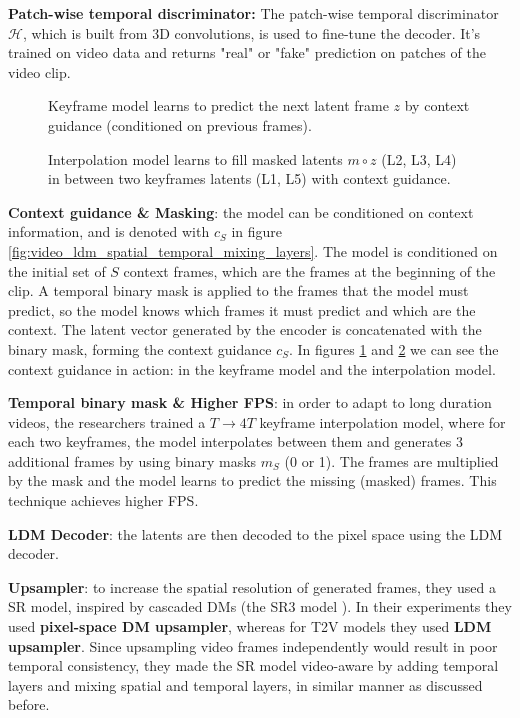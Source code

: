 \textbf{Patch-wise temporal discriminator:} The patch-wise temporal discriminator $\mathcal{H}$, which is built from 3D convolutions, is used to fine-tune the decoder. It's trained on video data and returns "real" or "fake" prediction on patches of the video clip.


\begin{figure}
    \centering
    \scalebox{0.4}{
        
    }
    \caption{Keyframe model learns to predict the next latent frame $z$ by context guidance (conditioned on previous frames).}
    \label{fig:video_ldm_keyframes}
\end{figure}

\begin{figure}
    \centering
    \scalebox{0.4}{
        
    }
    \caption{Interpolation model learns to fill masked latents $m \circ z$ (L2, L3, L4) in between two keyframes latents (L1, L5) with context guidance.}
    \label{fig:vifdeo_ldm_interpolation}
\end{figure}

\textbf{Context guidance \& Masking}: the model can be conditioned on context information, and is denoted with $c_S$ in figure \ref{fig:video_ldm_spatial_temporal_mixing_layers}. The model is conditioned on the initial set of $S$ context frames, which are the frames at the beginning of the clip. A temporal binary mask is applied to the frames that the model must predict, so the model knows which frames it must predict and which are the context. The latent vector generated by the encoder is concatenated with the binary mask, forming the context guidance $c_S$. In figures \ref{fig:video_ldm_keyframes} and \ref{fig:vifdeo_ldm_interpolation} we can see the context guidance in action: in the keyframe model and the interpolation model.

\textbf{Temporal binary mask \& Higher FPS}: in order to adapt to long duration videos, the researchers trained a $T \rightarrow 4T$ keyframe interpolation model, where for each two keyframes, the model interpolates between them and generates 3 additional frames by using binary masks $m_S$ (0 or 1). The frames are multiplied by the mask and the model learns to predict the missing (masked) frames. This technique achieves higher FPS.

\textbf{LDM Decoder}: the latents are then decoded to the pixel space using the LDM decoder.

\textbf{Upsampler}: to increase the spatial resolution of generated frames, they used a SR model, inspired by cascaded DMs \cite{cascaded_diffusion_models} (the SR3 model \cite{sr3}). In their experiments they used \textbf{pixel-space DM upsampler}, whereas for T2V models they used \textbf{LDM upsampler}. Since upsampling video frames independently would result in poor temporal consistency, they made the SR model video-aware by adding temporal layers and mixing spatial and temporal layers, in similar manner as discussed before.

